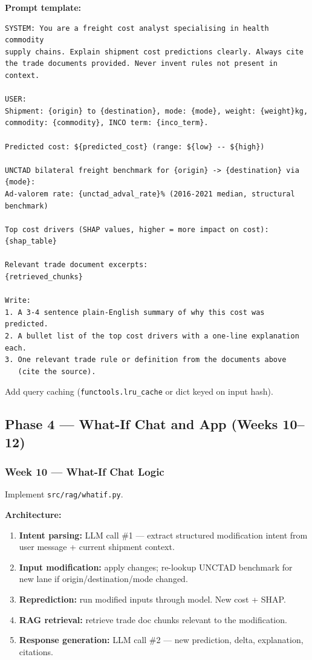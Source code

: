 \documentclass[11pt, a4paper]{article}
\begin{document}
\textbf{Prompt template:}
\begin{lstlisting}
SYSTEM: You are a freight cost analyst specialising in health commodity
supply chains. Explain shipment cost predictions clearly. Always cite
the trade documents provided. Never invent rules not present in context.

USER:
Shipment: {origin} to {destination}, mode: {mode}, weight: {weight}kg,
commodity: {commodity}, INCO term: {inco_term}.

Predicted cost: ${predicted_cost} (range: ${low} -- ${high})

UNCTAD bilateral freight benchmark for {origin} -> {destination} via {mode}:
Ad-valorem rate: {unctad_adval_rate}% (2016-2021 median, structural benchmark)

Top cost drivers (SHAP values, higher = more impact on cost):
{shap_table}

Relevant trade document excerpts:
{retrieved_chunks}

Write:
1. A 3-4 sentence plain-English summary of why this cost was predicted.
2. A bullet list of the top cost drivers with a one-line explanation each.
3. One relevant trade rule or definition from the documents above
   (cite the source).
\end{lstlisting}

Add query caching (\texttt{functools.lru\_cache} or dict keyed on input hash).

\subsection{Phase 4 --- What-If Chat and App (Weeks 10--12)}

\subsubsection*{Week 10 --- What-If Chat Logic}

Implement \texttt{src/rag/whatif.py}.

\textbf{Architecture:}
\begin{enumerate}
  \item \textbf{Intent parsing:} LLM call \#1 --- extract structured modification intent from user message + current shipment context.
  \item \textbf{Input modification:} apply changes; re-lookup UNCTAD benchmark for new lane if origin/destination/mode changed.
  \item \textbf{Reprediction:} run modified inputs through model. New cost + SHAP.
  \item \textbf{RAG retrieval:} retrieve trade doc chunks relevant to the modification.
  \item \textbf{Response generation:} LLM call \#2 --- new prediction, delta, explanation, citations.
\end{enumerate}
\end{document}
